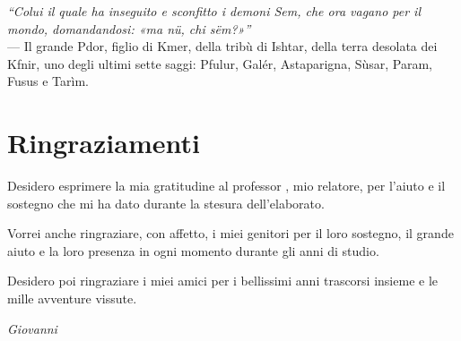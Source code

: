 \cleardoublepage
{}
{}

\begin{flushright}{
    \slshape
    ``Colui il quale ha inseguito e sconfitto i demoni Sem, che ora vagano per il mondo, domandandosi: «ma nü, chi sëm?»''} \\
    \medskip
    --- Il grande Pdor, figlio di Kmer, della tribù di Ishtar, della terra desolata dei Kfnir, uno degli ultimi sette saggi: Pfulur, Galér, Astaparigna, Sùsar, Param, Fusus e Tarìm.
\end{flushright}
\bigskip

\begingroup
\let\clearpage\relax
\let\cleardoublepage\relax
\let\cleardoublepage\relax

\chapter*{Ringraziamenti}

\noindent Desidero esprimere la mia gratitudine al professor \myProf, mio relatore, per l'aiuto e il sostegno che mi ha dato durante la stesura dell'elaborato.

\noindent Vorrei anche ringraziare, con affetto, i miei genitori per il loro sostegno, il grande aiuto e la loro presenza in ogni momento durante gli anni di studio.

\noindent Desidero poi ringraziare i miei amici per i bellissimi anni trascorsi insieme e le mille avventure vissute.
\bigskip

\noindent{\myLocation, \myTime}
\hfill \textit{Giovanni} %

\endgroup
